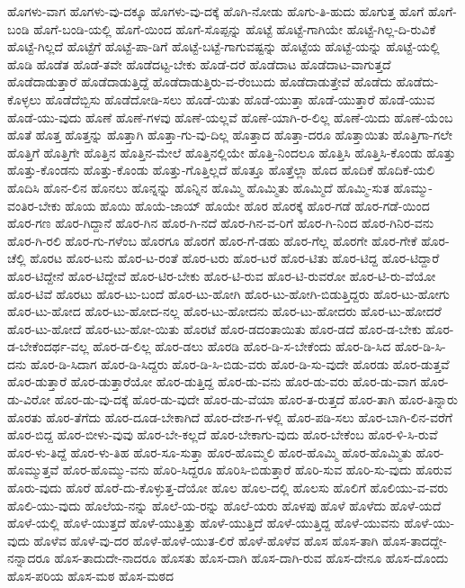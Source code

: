 ಹೊಗಳು-ವಾಗ
ಹೊಗಳು-ವು-ದಕ್ಕೂ
ಹೊಗಳು-ವು-ದಕ್ಕೆ
ಹೊಗಿ-ನೋಡು
ಹೊಗು-ತಿ-ಹುದು
ಹೊಗುತ್ತ
ಹೊಗೆ
ಹೊಗೆ-ಬಂಡಿ
ಹೊಗೆ-ಬಂಡಿ-ಯಲ್ಲಿ
ಹೊಗೆ-ಯಿಂದ
ಹೊಗೆ-ಸೊಪ್ಪನ್ನು
ಹೊಟ್ಟೆ
ಹೊಟ್ಟೆ-ಗಾಗಿಯೇ
ಹೊಟ್ಟೆ-ಗಿಲ್ಲ-ದಿ-ರುವಿಕೆ
ಹೊಟ್ಟೆ-ಗಿಲ್ಲದೆ
ಹೊಟ್ಟೆಗೆ
ಹೊಟ್ಟೆ-ಪಾ-ಡಿಗೆ
ಹೊಟ್ಟೆ-ಬಟ್ಟೆ-ಗಾಗುವಷ್ಟನ್ನು
ಹೊಟ್ಟೆಯ
ಹೊಟ್ಟೆ-ಯನ್ನು
ಹೊಟ್ಟೆ-ಯಲ್ಲಿ
ಹೊಡಿ
ಹೊಡೆತ
ಹೊಡೆ-ತವೇ
ಹೊಡೆದಟ್ಟ-ಬೇಕು
ಹೊಡೆ-ದರೆ
ಹೊಡೆದಾಟ
ಹೊಡೆದಾಟ-ವಾಗುತ್ತದೆ
ಹೊಡೆದಾಡುತ್ತಾರೆ
ಹೊಡೆದಾಡುತ್ತಿದ್ದೆ
ಹೊಡೆದಾಡುತ್ತಿರು-ವ-ರೆಂಬುದು
ಹೊಡೆದಾಡುತ್ತೇವೆ
ಹೊಡೆದು
ಹೊಡೆದು-ಕೊಳ್ಳಲು
ಹೊಡೆದೆಬ್ಬಿಸು
ಹೊಡೆದೋಡಿ-ಸಲು
ಹೊಡೆ-ಯಿತು
ಹೊಡೆ-ಯುತ್ತಾ
ಹೊಡೆ-ಯುತ್ತಾರೆ
ಹೊಡೆ-ಯುವ
ಹೊಡೆ-ಯು-ವುದು
ಹೊಣೆ
ಹೊಣೆ-ಗಳವು
ಹೊಣೆ-ಯಲ್ಲವೆ
ಹೊಣೆ-ಯಾಗಿ-ರ-ಲಿಲ್ಲ
ಹೊಣೆ-ಯಿದು
ಹೊಣೆ-ಯೆಂಬ
ಹೊತೆ
ಹೊತ್ತ
ಹೊತ್ತನ್ನು
ಹೊತ್ತಾಗಿ
ಹೊತ್ತಾ-ಗು-ವು-ದಿಲ್ಲ
ಹೊತ್ತಾದ
ಹೊತ್ತಾ-ದರೂ
ಹೊತ್ತಾಯಿತು
ಹೊತ್ತಿಗಾ-ಗಲೇ
ಹೊತ್ತಿಗೆ
ಹೊತ್ತಿಗೇ
ಹೊತ್ತಿನ
ಹೊತ್ತಿನ-ಮೇಲೆ
ಹೊತ್ತಿನಲ್ಲಿಯೇ
ಹೊತ್ತಿ-ನಿಂದಲೂ
ಹೊತ್ತಿಸಿ
ಹೊತ್ತಿಸಿ-ಕೊಂಡು
ಹೊತ್ತು
ಹೊತ್ತು-ಕೊಂಡನು
ಹೊತ್ತು-ಕೊಂಡು
ಹೊತ್ತು-ಗೊತ್ತಿಲ್ಲದೆ
ಹೊತ್ತೂ
ಹೊತ್ತೆಲ್ಲಾ
ಹೊದ
ಹೊದಿಕೆ
ಹೊದಿಕೆ-ಯಲಿ
ಹೊದಿಸಿ
ಹೊನ-ಲಿನ
ಹೊನಲು
ಹೊನ್ನನ್ನು
ಹೊನ್ನಿನ
ಹೊಮ್ಮಿ
ಹೊಮ್ಮಿತು
ಹೊಮ್ಮಿದೆ
ಹೊಮ್ಮಿ-ಸುತ
ಹೊಮ್ಮು-ವಂತಿರ-ಬೇಕು
ಹೊಯ
ಹೊಯಿ
ಹೊಯೆ-ಜಾಯ್
ಹೊಯೇ
ಹೊರ
ಹೊರಕ್ಕೆ
ಹೊರ-ಗಡೆ
ಹೊರ-ಗಡೆ-ಯಿಂದ
ಹೊರ-ಗಣ
ಹೊರ-ಗಿದ್ದಾನೆ
ಹೊರ-ಗಿನ
ಹೊರ-ಗಿ-ನದೆ
ಹೊರ-ಗಿನ-ವ-ರಿಗೆ
ಹೊರ-ಗಿ-ನಿಂದ
ಹೊರ-ಗಿನಿರ-ವನು
ಹೊರ-ಗಿ-ರಲಿ
ಹೊರ-ಗು-ಗಳೆಂಬ
ಹೊರಗೂ
ಹೊರಗೆ
ಹೊರ-ಗೆ-ಡಹು
ಹೊರ-ಗೆಲ್ಲ
ಹೊರಗೇ
ಹೊರ-ಗೇಕೆ
ಹೊರ-ಚೆಲ್ಲಿ
ಹೊರಟ
ಹೊರ-ಟನು
ಹೊರ-ಟ-ರಂತೆ
ಹೊರ-ಟರು
ಹೊರ-ಟರೆ
ಹೊರ-ಟಿತು
ಹೊರ-ಟಿದ್ದ
ಹೊರ-ಟಿದ್ದಾರೆ
ಹೊರ-ಟಿದ್ದೇನೆ
ಹೊರ-ಟಿದ್ದೇವೆ
ಹೊರ-ಟಿರ-ಬೇಕು
ಹೊರ-ಟಿ-ರುವ
ಹೊರ-ಟಿ-ರುವರೋ
ಹೊರ-ಟಿ-ರು-ವೆಯೋ
ಹೊರ-ಟಿವೆ
ಹೊರಟು
ಹೊರ-ಟು-ಬಂದೆ
ಹೊರ-ಟು-ಹೋಗಿ
ಹೊರ-ಟು-ಹೋಗಿ-ಬಿಡುತ್ತಿದ್ದರು
ಹೊರ-ಟು-ಹೋಗು
ಹೊರ-ಟು-ಹೋದ
ಹೊರ-ಟು-ಹೋದ-ನಲ್ಲ
ಹೊರ-ಟು-ಹೋದನು
ಹೊರ-ಟು-ಹೋದರು
ಹೊರ-ಟು-ಹೋದರೆ
ಹೊರ-ಟು-ಹೋದೆ
ಹೊರ-ಟು-ಹೋ-ಯಿತು
ಹೊರಟೆ
ಹೊರ-ಡದಂತಾಯಿತು
ಹೊರ-ಡದೆ
ಹೊರ-ಡ-ಬೇಕು
ಹೊರ-ಡ-ಬೇಕೆಂದರ್ಥ-ವಲ್ಲ
ಹೊರ-ಡ-ಲಿಲ್ಲ
ಹೊರ-ಡಲು
ಹೊರಡಿ
ಹೊರ-ಡಿ-ಸ-ಬೇಕೆಂದು
ಹೊರ-ಡಿ-ಸಿದ
ಹೊರ-ಡಿ-ಸಿ-ದನು
ಹೊರ-ಡಿ-ಸಿದಾಗ
ಹೊರ-ಡಿ-ಸಿದ್ದರು
ಹೊರ-ಡಿ-ಸಿ-ಬಿಡು-ವರು
ಹೊರ-ಡಿ-ಸು-ವುದೇ
ಹೊರಡು
ಹೊರ-ಡುತ್ತವೆ
ಹೊರ-ಡುತ್ತಾರೆ
ಹೊರ-ಡುತ್ತಾರೆಯೋ
ಹೊರ-ಡುತ್ತಿದ್ದ
ಹೊರ-ಡು-ವನು
ಹೊರ-ಡು-ವರು
ಹೊರ-ಡು-ವಾಗ
ಹೊರ-ಡು-ವಿರೋ
ಹೊರ-ಡು-ವು-ದಕ್ಕೆ
ಹೊರ-ಡು-ವುದೇ
ಹೊರ-ಡು-ವೆಯಾ
ಹೊರ-ತ-ರುತ್ತದೆ
ಹೊರ-ತಾಗಿ
ಹೊರ-ತಿನ್ನಾರು
ಹೊರತು
ಹೊರ-ತೆಗೆದು
ಹೊರ-ದೂಡ-ಬೇಕಾಗಿದೆ
ಹೊರ-ದೇಶ-ಗ-ಳಲ್ಲಿ
ಹೊರ-ಪಡಿ-ಸಲು
ಹೊರ-ಬಾಗಿ-ಲಿನ-ವರೆಗೆ
ಹೊರ-ಬಿದ್ದ
ಹೊರ-ಬೀಳು-ವುವು
ಹೊರ-ಬೇ-ಕಲ್ಲದೆ
ಹೊರ-ಬೇಕಾಗು-ವುದು
ಹೊರ-ಬೇಕೆಂಬ
ಹೊರ-ಳಿ-ಸಿ-ರುವೆ
ಹೊರ-ಳು-ತಿದ್ದೆ
ಹೊರ-ಳು-ತಿಹ
ಹೊರ-ಸೂ-ಸುತ್ತಾ
ಹೊರ-ಹೊಮ್ಮಲಿ
ಹೊರ-ಹೊಮ್ಮಿ
ಹೊರ-ಹೊಮ್ಮಿತು
ಹೊರ-ಹೊಮ್ಮುತ್ತವೆ
ಹೊರ-ಹೊಮ್ಮು-ವನು
ಹೊರಿ-ಸಿದ್ದರೂ
ಹೊರಿಸಿ-ಬಿಡುತ್ತಾರೆ
ಹೊರಿ-ಸುವ
ಹೊರಿ-ಸು-ವುದು
ಹೊರುವ
ಹೊರು-ವುದು
ಹೊರೆ
ಹೊರೆ-ದು-ಕೊಳ್ಳುತ್ತ-ದೆಯೋ
ಹೊಲ
ಹೊಲ-ದಲ್ಲಿ
ಹೊಲಸು
ಹೊಲಿಗೆ
ಹೊಲಿಯು-ವ-ವರು
ಹೊಲಿ-ಯು-ವುದು
ಹೊಲೆಯ-ನನ್ನು
ಹೊಲೆ-ಯ-ರನ್ನು
ಹೊಲೆ-ಯರು
ಹೊಳಪು
ಹೊಳೆ
ಹೊಳೆದು
ಹೊಳೆ-ಯದೆ
ಹೊಳೆ-ಯಲ್ಲಿ
ಹೊಳೆ-ಯುತ್ತದೆ
ಹೊಳೆ-ಯುತ್ತಿತ್ತು
ಹೊಳೆ-ಯುತ್ತಿದೆ
ಹೊಳೆ-ಯುತ್ತಿದ್ದ
ಹೊಳೆ-ಯುವನು
ಹೊಳೆ-ಯು-ವುದು
ಹೊಳೆವ
ಹೊಳೆ-ವು-ದರ
ಹೊಳೆ-ಹೊಳೆ-ಯುತ-ಲಿರೆ
ಹೊಳೆ-ಹೊಳೆವ
ಹೊಸ
ಹೊಸ-ತಾಗಿ
ಹೊಸ-ತಾದದ್ದೇ-ನನ್ನಾದರೂ
ಹೊಸ-ತಾದುದೇ-ನಾದರೂ
ಹೊಸತು
ಹೊಸ-ದಾಗಿ
ಹೊಸ-ದಾಗಿ-ರುವ
ಹೊಸ-ದೇನೂ
ಹೊಸ-ದೊಂದು
ಹೊಸ-ಪರಿಯ
ಹೊಸ-ಮಠ
ಹೊಸ-ಮಠದ
